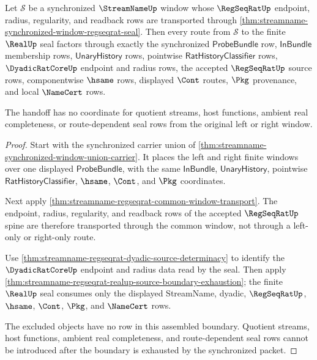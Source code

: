 \begin{theorem}
\label{thm:streamname-synchronized-window-real-seal-handoff}
Let $\mathcal S$ be a synchronized $\StreamNameUp$ window whose
$\RegSeqRatUp$ endpoint, radius, regularity, and readback rows are transported
through \autoref{thm:streamname-synchronized-window-regseqrat-seal}. Then
every route from $\mathcal S$ to the finite $\RealUp$ seal factors through
exactly the synchronized $\mathsf{ProbeBundle}$ row, $\mathsf{InBundle}$
membership rows, $\mathsf{UnaryHistory}$ rows, pointwise
$\mathsf{RatHistoryClassifier}$ rows, $\DyadicRatCoreUp$ endpoint and radius
rows, the accepted $\RegSeqRatUp$ source rows, componentwise $\hsame$ rows,
displayed $\Cont$ routes, $\Pkg$ provenance, and local $\NameCert$ rows.

The handoff has no coordinate for quotient streams, host functions, ambient
real completeness, or route-dependent seal rows from the original left or
right window.
\end{theorem}
\begin{proof}
Start with the synchronized carrier union of
\autoref{thm:streamname-synchronized-window-union-carrier}. It places the
left and right finite windows over one displayed $\mathsf{ProbeBundle}$, with
the same $\mathsf{InBundle}$, $\mathsf{UnaryHistory}$, pointwise
$\mathsf{RatHistoryClassifier}$, $\hsame$, $\Cont$, and $\Pkg$ coordinates.

Next apply \autoref{thm:streamname-regseqrat-common-window-transport}. The
endpoint, radius, regularity, and readback rows of the accepted
$\RegSeqRatUp$ spine are therefore transported through the common window, not
through a left-only or right-only route.

Use \autoref{thm:streamname-regseqrat-dyadic-source-determinacy} to identify
the $\DyadicRatCoreUp$ endpoint and radius data read by the seal. Then apply
\autoref{thm:streamname-regseqrat-realup-source-boundary-exhaustion}; the
finite $\RealUp$ seal consumes only the displayed StreamName, dyadic,
$\RegSeqRatUp$, $\hsame$, $\Cont$, $\Pkg$, and $\NameCert$ rows.

The excluded objects have no row in this assembled boundary. Quotient
streams, host functions, ambient real completeness, and route-dependent seal
rows cannot be introduced after the boundary is exhausted by the synchronized
packet.
\end{proof}

